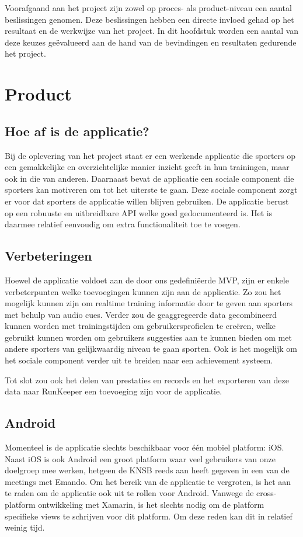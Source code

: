 Voorafgaand aan het project zijn zowel op proces- als product-niveau een aantal beslissingen genomen. Deze beslissingen hebben een directe invloed gehad op het resultaat en de werkwijze van het project. In dit hoofdstuk worden een aantal van deze keuzes geëvalueerd aan de hand van de bevindingen en resultaten gedurende het project. 

\section{Product}

\subsection{Hoe af is de applicatie?}
Bij de oplevering van het project staat er een werkende applicatie die sporters op een gemakkelijke en overzichtelijke manier inzicht geeft in hun trainingen, maar ook in die van anderen. Daarnaast bevat de applicatie een sociale component die sporters kan motiveren om tot het uiterste te gaan. Deze sociale component zorgt er voor dat sporters de applicatie willen blijven gebruiken. De applicatie berust op een robuuste en uitbreidbare API welke goed gedocumenteerd is. Het is daarmee relatief eenvoudig om extra functionaliteit toe te voegen.

\subsection{Verbeteringen}
Hoewel de applicatie voldoet aan de door ons gedefiniëerde MVP, zijn er enkele verbeterpunten welke toevoegingen kunnen zijn aan de applicatie. Zo zou het mogelijk kunnen zijn om realtime training informatie door te geven aan sporters met behulp van audio cues. 
Verder zou de geaggregeerde data gecombineerd kunnen worden met trainingstijden om gebruikersprofielen te creëren, welke gebruikt kunnen worden om gebruikers suggesties aan te kunnen bieden om met andere sporters van gelijkwaardig niveau te gaan sporten.
Ook is het mogelijk om het sociale component verder uit te breiden naar een achievement systeem. 

Tot slot zou ook het delen van prestaties en records en het exporteren van deze data naar RunKeeper een toevoeging zijn voor de applicatie.

\subsection{Android}
Momenteel is de applicatie slechts beschikbaar voor één mobiel platform: iOS. Naast iOS is ook Android een groot platform waar veel gebruikers van onze doelgroep mee werken, hetgeen de \ac{KNSB} reeds aan heeft gegeven in een van de meetings met Emando. Om het bereik van de applicatie te vergroten, is het aan te raden om de applicatie ook uit te rollen voor Android. Vanwege de cross-platform ontwikkeling met Xamarin, is het slechts nodig om de platform specifieke views te schrijven voor dit platform. Om deze reden kan dit in relatief weinig tijd.


